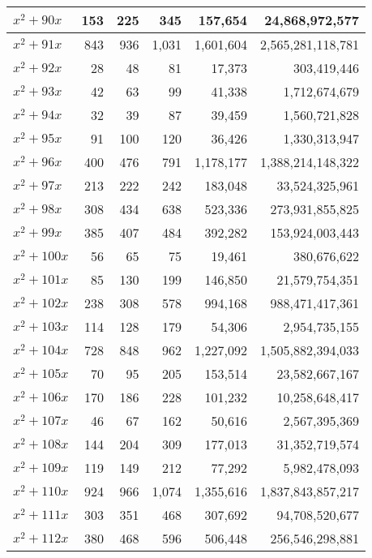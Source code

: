 \documentclass[a4paper]{amsproc}
\theoremstyle{plain}
\theoremstyle{named}
\begin{document}
\begin{longtable}{ | l | r | r | r | r | r | }
$x^2 + 90x$ & 153 & 225 & 345 & 157{,}654 & 24{,}868{,}972{,}577 \\ \hline
$x^2 + 91x$ & 843 & 936 & 1{,}031 & 1{,}601{,}604 & 2{,}565{,}281{,}118{,}781 \\ \hline
$x^2 + 92x$ & 28 & 48 & 81 & 17{,}373 & 303{,}419{,}446 \\ \hline
$x^2 + 93x$ & 42 & 63 & 99 & 41{,}338 & 1{,}712{,}674{,}679 \\ \hline
$x^2 + 94x$ & 32 & 39 & 87 & 39{,}459 & 1{,}560{,}721{,}828 \\ \hline
$x^2 + 95x$ & 91 & 100 & 120 & 36{,}426 & 1{,}330{,}313{,}947 \\ \hline
$x^2 + 96x$ & 400 & 476 & 791 & 1{,}178{,}177 & 1{,}388{,}214{,}148{,}322 \\ \hline
$x^2 + 97x$ & 213 & 222 & 242 & 183{,}048 & 33{,}524{,}325{,}961 \\ \hline
$x^2 + 98x$ & 308 & 434 & 638 & 523{,}336 & 273{,}931{,}855{,}825 \\ \hline
$x^2 + 99x$ & 385 & 407 & 484 & 392{,}282 & 153{,}924{,}003{,}443 \\ \hline
$x^2 + 100x$ & 56 & 65 & 75 & 19{,}461 & 380{,}676{,}622 \\ \hline
$x^2 + 101x$ & 85 & 130 & 199 & 146{,}850 & 21{,}579{,}754{,}351 \\ \hline
$x^2 + 102x$ & 238 & 308 & 578 & 994{,}168 & 988{,}471{,}417{,}361 \\ \hline
$x^2 + 103x$ & 114 & 128 & 179 & 54{,}306 & 2{,}954{,}735{,}155 \\ \hline
$x^2 + 104x$ & 728 & 848 & 962 & 1{,}227{,}092 & 1{,}505{,}882{,}394{,}033 \\ \hline
$x^2 + 105x$ & 70 & 95 & 205 & 153{,}514 & 23{,}582{,}667{,}167 \\ \hline
$x^2 + 106x$ & 170 & 186 & 228 & 101{,}232 & 10{,}258{,}648{,}417 \\ \hline
$x^2 + 107x$ & 46 & 67 & 162 & 50{,}616 & 2{,}567{,}395{,}369 \\ \hline
$x^2 + 108x$ & 144 & 204 & 309 & 177{,}013 & 31{,}352{,}719{,}574 \\ \hline
$x^2 + 109x$ & 119 & 149 & 212 & 77{,}292 & 5{,}982{,}478{,}093 \\ \hline
$x^2 + 110x$ & 924 & 966 & 1{,}074 & 1{,}355{,}616 & 1{,}837{,}843{,}857{,}217 \\ \hline
$x^2 + 111x$ & 303 & 351 & 468 & 307{,}692 & 94{,}708{,}520{,}677 \\ \hline
$x^2 + 112x$ & 380 & 468 & 596 & 506{,}448 & 256{,}546{,}298{,}881 \\ \hline

\end{longtable}
\end{document}
